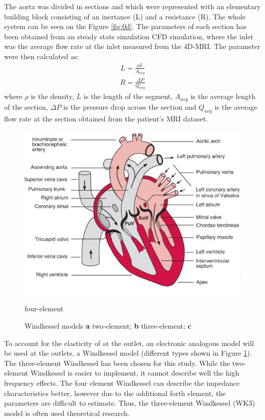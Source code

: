 The aorta was divided in sections and which were represented with an elementary building block consisting of an inertance (L) and a resistance (R). The whole system can be seen on the Figure \ref{fig:0d}. The parameters of each section has been obtained from an steady state simulation CFD simulation, where the inlet was the average flow rate at the inlet measured from the 4D-MRI. The parameter were then calculated as:
\begin{align}
    L = \frac{\rho L}{A_{avg}}
\end{align}
\begin{align}
    R = \frac{\Delta P}{Q_{avg}}
\end{align}
where $\rho$ is the density, $L$ is the length of the segment, $A_{avg}$ is the average length of the section, $\Delta P$ is the pressure drop across the section and $Q_{avg}$ is the average flow rate at the section obtained from the patient's MRI dataset.\par

\begin{figure}[ht!]
  \centering
  \includegraphics[draft]{Figures/heart}
  \caption{Windkessel models \textbf{a} two-element; \textbf{b} three-element; \textbf{c}} four-element
  \label{fig:wind}
\end{figure}

To account for the elasticity of at the outlet, an electronic analogous model will be used at the outlets, a Windkessel model (different types shown in Figure \ref{fig:wind}). The three-element Windkessel has been chosen for this study. While the two-element Windkessel is easier to implement, it cannot describe well the high frequency effects. The four element Windkessel can describe the impedance characteristics better, however due to the additional forth element, the parameters are difficult to estimate. Thus, the three-element Windkessel (WK3) model is often used theoretical research. \par

